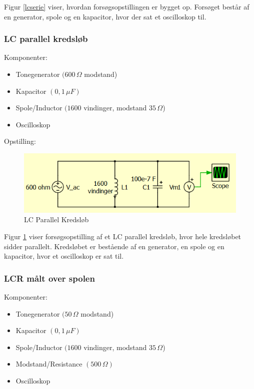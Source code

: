 Figur \ref{lcserie} viser, hvordan forsøgsopstillingen er bygget op. Forsøget består af en generator, spole og en kapacitor, hvor der sat et oscilloskop til.

\subsubsection{LC parallel kredsløb}

Komponenter:

\begin{itemize}
\item Tonegenerator $(600\, \Omega$ modstand)
\item Kapacitor $( 0,1\, \mu F)$
\item Spole/Inductor $(1600$ vindinger, modstand $35 \, \Omega$)
\item Oscilloskop
\end{itemize}

Opstilling:

\begin{figure}[H]
\centering
\includegraphics[scale=1]{Vildledning/Schematics/Kredslb/LC_Parallel}
\caption{LC Parallel Kredsløb}
\label{lcparallel}
\end{figure}

Figur \ref{lcparallel} viser forsøgsopstilling af et LC parallel kredsløb, hvor hele kredsløbet sidder parallelt. Kredsløbet er bestående af en generator, en spole og en kapacitor, hvor et oscilloskop er sat til.

\subsubsection{LCR målt over spolen}

Komponenter:

\begin{itemize}
\item Tonegenerator $(50\, \Omega$ modstand)
\item Kapacitor $( 0,1\, \mu F)$
\item Spole/Inductor $(1600$ vindinger, modstand $35 \, \Omega$)
\item Modstand/Resistance $(500\, \Omega)$
\item Oscilloskop
\end{itemize}

